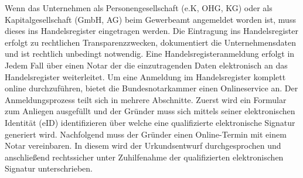 Wenn das Unternehmen als Personengesellschaft (e.K, OHG, KG) oder als Kapitalgesellschaft (GmbH, AG) beim Gewerbeamt angemeldet worden ist, muss dieses ins Handelsregister eingetragen werden. 
Die Eintragung ins Handelsregister erfolgt zu rechtlichen Transparenzzwecken, dokumentiert die Unternehmensdaten und ist rechtlich unbedingt notwendig. 
Eine Handelsregisteranmeldung erfolgt in Jedem Fall über einen Notar der die einzutragenden Daten elektronisch an das Handelsregister weiterleitet. 
Um eine Anmeldung im Handelsregister komplett online durchzuführen, bietet die Bundesnotarkammer einen Onlineservice an. 
Der Anmeldungsprozess teilt sich in mehrere Abschnitte. Zuerst wird ein Formular zum Anliegen ausgefüllt und der Gründer muss sich mittels seiner elektronischen Identität (eID) identifizieren über welche eine qualifizierte elektronische Signatur generiert wird. 
Nachfolgend muss der Gründer einen Online-Termin mit einem Notar vereinbaren. In diesem wird der Urkundsentwurf durchgesprochen und anschließend rechtssicher unter Zuhilfenahme der qualifizierten elektronischen Signatur unterschrieben. 
